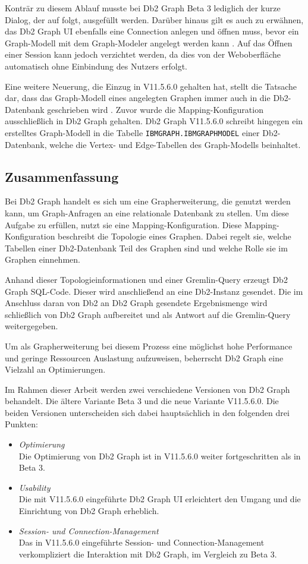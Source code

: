 Konträr zu diesem Ablauf musste bei Db2 Graph Beta 3 lediglich der kurze Dialog, der auf  folgt, ausgefüllt werden. Darüber hinaus gilt es auch zu erwähnen, das Db2 Graph UI ebenfalls eine Connection anlegen und öffnen muss, bevor ein Graph-Modell mit dem Graph-Modeler angelegt werden kann \cite{ibm_docs_db2_graph_ui}. Auf das Öffnen einer Session kann jedoch verzichtet werden, da dies von der Weboberfläche automatisch ohne Einbindung des Nutzers erfolgt.

Eine weitere Neuerung, die Einzug in V11.5.6.0 gehalten hat, stellt die Tatsache dar, dass das Graph-Modell eines angelegten Graphen immer auch in die Db2-Datenbank geschrieben wird \cite{ibm_docs_privileges}. Zuvor wurde die Mapping-Konfiguration ausschließlich in Db2 Graph gehalten. Db2 Graph V11.5.6.0 schreibt hingegen ein erstelltes Graph-Modell in die Tabelle \texttt{IBMGRAPH.IBMGRAPHMODEL} einer Db2-Datenbank, welche die Vertex- und Edge-Tabellen des Graph-Modells beinhaltet. 

\subsection{Zusammenfassung}

Bei Db2 Graph handelt es sich um eine Grapherweiterung, die genutzt werden kann, um Graph-Anfragen an eine relationale Datenbank zu stellen. Um diese Aufgabe zu erfüllen, nutzt sie eine Mapping-Konfiguration. Diese Mapping-Konfiguration beschreibt die Topologie eines Graphen. Dabei regelt sie, welche Tabellen einer Db2-Datenbank Teil des Graphen sind und welche Rolle sie im Graphen einnehmen.

Anhand dieser Topologieinformationen und einer Gremlin-Query erzeugt Db2 Graph SQL-Code. Dieser wird anschließend an eine Db2-Instanz gesendet. Die im Anschluss daran von Db2 an Db2 Graph gesendete Ergebnismenge wird schließlich von Db2 Graph aufbereitet und als Antwort auf die Gremlin-Query weitergegeben. 

Um als Grapherweiterung bei diesem Prozess eine möglichst hohe Performance und geringe Ressourcen Auslastung aufzuweisen, beherrscht Db2 Graph eine Vielzahl an Optimierungen. 

Im Rahmen dieser Arbeit werden zwei verschiedene Versionen von Db2 Graph behandelt. Die ältere Variante Beta 3 und die neue Variante V11.5.6.0. Die beiden Versionen unterscheiden sich dabei hauptsächlich in den folgenden drei Punkten:

\begin{itemize}
    \item \textit{Optimierung}\\
    Die Optimierung von Db2 Graph ist in V11.5.6.0 weiter fortgeschritten als in Beta 3. 
    \item \textit{Usability}\\
    Die mit V11.5.6.0 eingeführte Db2 Graph UI erleichtert den Umgang und die Einrichtung von Db2 Graph erheblich. 
    \item \textit{Session- und Connection-Management}\\
    Das in V11.5.6.0 eingeführte Session- und Connection-Management verkompliziert die Interaktion mit Db2 Graph, im Vergleich zu Beta 3.
\end{itemize}